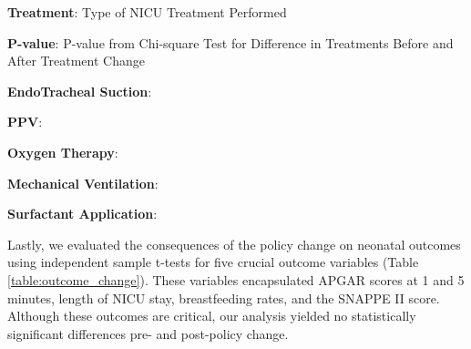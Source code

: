 \documentclass[11pt]{article}
\begin{document}
\begin{table}[h]
\caption{Chi-square test results for the difference in NICU treatments before and after policy change}
\label{table:treatment_change}
\begin{threeparttable}
\renewcommand{\TPTminimum}{\linewidth}
\begin{tablenotes}
\footnotesize
\item \textbf{Treatment}: Type of NICU Treatment Performed
\item \textbf{P-value}: P-value from Chi-square Test for Difference in Treatments Before and After Treatment Change
\item \textbf{EndoTracheal Suction}: 
\item \textbf{PPV}: 
\item \textbf{Oxygen Therapy}: 
\item \textbf{Mechanical Ventilation}: 
\item \textbf{Surfactant Application}: 
\end{tablenotes}
\end{threeparttable}
\end{table}


Lastly, we evaluated the consequences of the policy change on neonatal outcomes using independent sample t-tests for five crucial outcome variables (Table \ref{table:outcome_change}). These variables encapsulated APGAR scores at 1 and 5 minutes, length of NICU stay, breastfeeding rates, and the SNAPPE II score. Although these outcomes are critical, our analysis yielded no statistically significant differences pre- and post-policy change.
\end{document}
